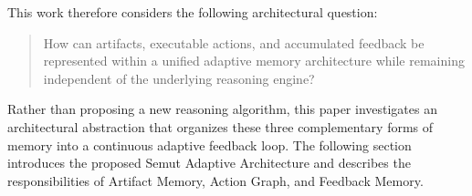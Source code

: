 This work therefore considers the following architectural question:

\begin{quote}
How can artifacts, executable actions, and accumulated feedback be represented within a unified adaptive memory architecture while remaining independent of the underlying reasoning engine?
\end{quote}

Rather than proposing a new reasoning algorithm, this paper investigates an architectural abstraction that organizes these three complementary forms of memory into a continuous adaptive feedback loop. The following section introduces the proposed Semut Adaptive Architecture and describes the responsibilities of Artifact Memory, Action Graph, and Feedback Memory.
